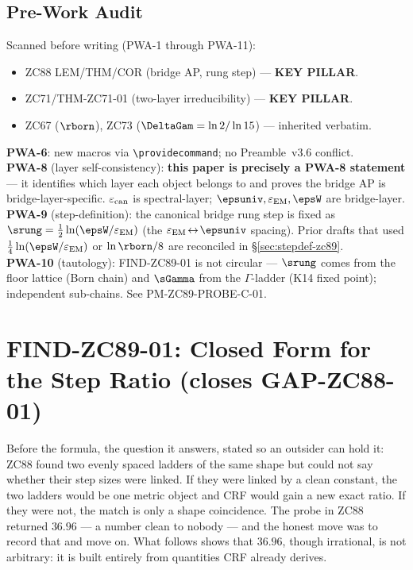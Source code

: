 \documentclass[12pt, a4paper]{article}
\renewcommand{\epsEM}{\varepsilon_{\rm EM}}     %
\renewcommand{\epscan}{\varepsilon_{\rm can}}   %
\begin{document}
\subsection{Pre-Work Audit}

\begin{formalbox}[title={Pre-Work Audit Record --- ZC89}]
Scanned before writing (PWA-1 through PWA-11):
\begin{itemize}[leftmargin=2em, noitemsep]
  \item ZC88 LEM/THM/COR (bridge AP, rung step) --- \textbf{KEY PILLAR}.
  \item ZC71/THM-ZC71-01 (two-layer irreducibility) --- \textbf{KEY PILLAR}.
  \item ZC67 ($\rborn$), ZC73 ($\DeltaGam=\ln2/\ln15$) --- inherited verbatim.
\end{itemize}
\textbf{PWA-6}: new macros via \texttt{\textbackslash providecommand}; no
Preamble~v3.6 conflict.\\
\textbf{PWA-8} (layer self-consistency): \textbf{this paper is precisely a
PWA-8 statement} --- it identifies which layer each object belongs to and
proves the bridge AP is bridge-layer-specific. $\epscan$ is spectral-layer;
$\epsuniv,\epsEM,\epsW$ are bridge-layer.\\
\textbf{PWA-9} (step-definition): the canonical bridge rung step is fixed as
$\srung=\tfrac12\ln(\epsW/\epsEM)$ (the $\epsEM\!\leftrightarrow\!\epsuniv$
spacing). Prior drafts that used $\tfrac14\ln(\epsW/\epsEM)$ or
$\ln\rborn/8$ are reconciled in \S\ref{sec:stepdef-zc89}.\\
\textbf{PWA-10} (tautology): FIND-ZC89-01 is not circular --- $\srung$ comes
from the floor lattice (Born chain) and $\sGamma$ from the $\Gamma$-ladder
(K14 fixed point); independent sub-chains. See PM-ZC89-PROBE-C-01.
\end{formalbox}

\newpage

\section{FIND-ZC89-01: Closed Form for the Step Ratio (closes GAP-ZC88-01)}
\label{sec:find-zc89}

Before the formula, the question it answers, stated so an outsider can hold
it: ZC88 found two evenly spaced ladders of the same shape but could not say
whether their step sizes were linked. If they were linked by a clean
constant, the two ladders would be one metric object and CRF would gain a
new exact ratio. If they were not, the match is only a shape coincidence.
The probe in ZC88 returned $36.96$ --- a number clean to nobody --- and the
honest move was to record that and move on. What follows shows that $36.96$,
though irrational, is not arbitrary: it is built entirely from quantities
CRF already derives.
\end{document}
